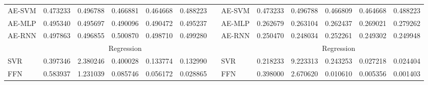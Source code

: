 \documentclass[11pt,a4paper]{article}
\numberwithin{equation}{section}
\begin{document}
\begin{table}[]
{\begin{tabular}{@{}lllllllllllll@{}}
\multicolumn{1}{|l|}{AE-SVM} & \multicolumn{1}{l|}{0.473233} & \multicolumn{1}{l|}{0.496788} & \multicolumn{1}{l|}{0.466881} & \multicolumn{1}{l|}{0.464668} & \multicolumn{1}{l|}{0.488223} & \multicolumn{1}{l|}{} & \multicolumn{1}{l|}{AE-SVM} & \multicolumn{1}{l|}{0.473233} & \multicolumn{1}{l|}{0.496788}  & \multicolumn{1}{l|}{0.466809} & \multicolumn{1}{l|}{0.464668} & \multicolumn{1}{l|}{0.488223} \\ \cmidrule(r){1-6} \cmidrule(l){8-13}
\multicolumn{1}{|l|}{AE-MLP} & \multicolumn{1}{l|}{0.495340} & \multicolumn{1}{l|}{0.495697} & \multicolumn{1}{l|}{0.490096} & \multicolumn{1}{l|}{0.490472} & \multicolumn{1}{l|}{0.495237} & \multicolumn{1}{l|}{} & \multicolumn{1}{l|}{AE-MLP} & \multicolumn{1}{l|}{0.262679} & \multicolumn{1}{l|}{0.263104}  & \multicolumn{1}{l|}{0.262437} & \multicolumn{1}{l|}{0.269021} & \multicolumn{1}{l|}{0.279262} \\ \cmidrule(r){1-6} \cmidrule(l){8-13}
\multicolumn{1}{|l|}{AE-RNN} & \multicolumn{1}{l|}{0.497863} & \multicolumn{1}{l|}{0.496855} & \multicolumn{1}{l|}{0.500870} & \multicolumn{1}{l|}{0.498710} & \multicolumn{1}{l|}{0.499280} & \multicolumn{1}{l|}{} & \multicolumn{1}{l|}{AE-RNN} & \multicolumn{1}{l|}{0.250470} & \multicolumn{1}{l|}{0.248034}  & \multicolumn{1}{l|}{0.252261} & \multicolumn{1}{l|}{0.249302} & \multicolumn{1}{l|}{0.249948} \\ \cmidrule(r){1-6} \cmidrule(l){8-13}
                             & \multicolumn{5}{c}{Regression}                                                                                                                                &                       &                             & \multicolumn{5}{c}{Regression}                                                                                                                                 \\ \cmidrule(r){1-6} \cmidrule(l){8-13}
\multicolumn{1}{|l|}{SVR}    & \multicolumn{1}{l|}{0.397346} & \multicolumn{1}{l|}{2.380246} & \multicolumn{1}{l|}{0.400028} & \multicolumn{1}{l|}{0.133774} & \multicolumn{1}{l|}{0.132990} & \multicolumn{1}{l|}{} & \multicolumn{1}{l|}{SVR}    & \multicolumn{1}{l|}{0.218233} & \multicolumn{1}{l|}{9.223313}  & \multicolumn{1}{l|}{0.243253} & \multicolumn{1}{l|}{0.027218} & \multicolumn{1}{l|}{0.024404} \\ \cmidrule(r){1-6} \cmidrule(l){8-13}
\multicolumn{1}{|l|}{FFN}    & \multicolumn{1}{l|}{0.583937} & \multicolumn{1}{l|}{1.231039} & \multicolumn{1}{l|}{0.085746} & \multicolumn{1}{l|}{0.056172} & \multicolumn{1}{l|}{0.028865} & \multicolumn{1}{l|}{} & \multicolumn{1}{l|}{FFN}    & \multicolumn{1}{l|}{0.398000} & \multicolumn{1}{l|}{2.670620}  & \multicolumn{1}{l|}{0.010610} & \multicolumn{1}{l|}{0.005356} & \multicolumn{1}{l|}{0.001403} \\ \cmidrule(r){1-6} \cmidrule(l){8-13}

\end{tabular}}
\end{table}
\end{document}

